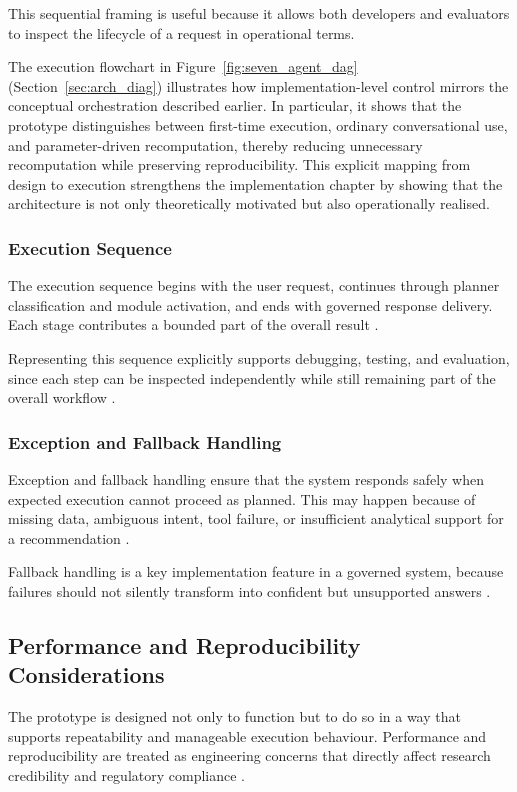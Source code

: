 \documentclass[11pt]{article}
\begin{document}
This sequential framing is useful because it allows both developers and evaluators to inspect the lifecycle of a request in operational terms.

The execution flowchart in Figure~\ref{fig:seven_agent_dag} (Section~\ref{sec:arch_diag}) illustrates how implementation-level control mirrors the conceptual orchestration described earlier. In particular, it shows that the prototype distinguishes between first-time execution, ordinary conversational use, and parameter-driven recomputation, thereby reducing unnecessary recomputation while preserving reproducibility. This explicit mapping from design to execution strengthens the implementation chapter by showing that the architecture is not only theoretically motivated but also operationally realised.

\subsubsection{Execution Sequence}
The execution sequence begins with the user request, continues through planner classification and module activation, and ends with governed response delivery. Each stage contributes a bounded part of the overall result \cite{wu2023,yu2023}.

Representing this sequence explicitly supports debugging, testing, and evaluation, since each step can be inspected independently while still remaining part of the overall workflow \cite{white2000}.

\subsubsection{Exception and Fallback Handling}
Exception and fallback handling ensure that the system responds safely when expected execution cannot proceed as planned. This may happen because of missing data, ambiguous intent, tool failure, or insufficient analytical support for a recommendation \cite{ji2023,white2000}.

Fallback handling is a key implementation feature in a governed system, because failures should not silently transform into confident but unsupported answers \cite{adadi2018,aiact2024}.

\subsection{Performance and Reproducibility Considerations}
The prototype is designed not only to function but to do so in a way that supports repeatability and manageable execution behaviour. Performance and reproducibility are treated as engineering concerns that directly affect research credibility and regulatory compliance \cite{white2000,lo2002}.
\end{document}
